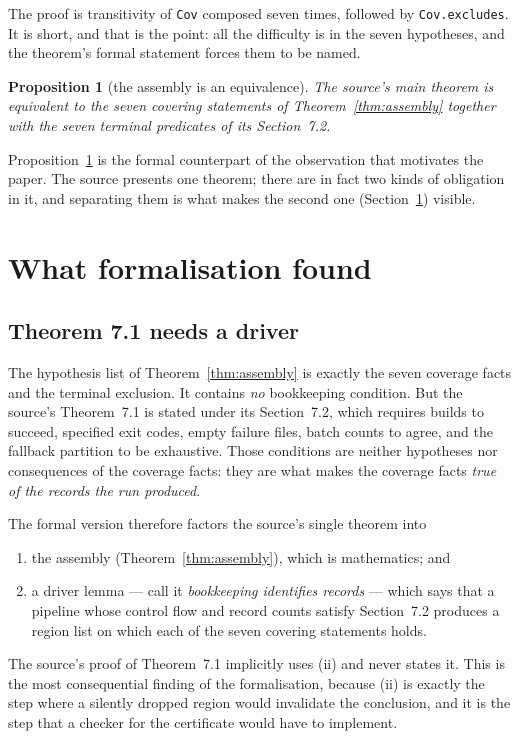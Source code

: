 \documentclass[11pt]{article}
\newtheorem{proposition}[theorem]{Proposition}
\theoremstyle{definition}
\begin{document}
The proof is transitivity of \texttt{Cov} composed seven times, followed by
\texttt{Cov.excludes}. It is short, and that is the point: all the difficulty is in the seven
hypotheses, and the theorem's formal statement forces them to be named.

\begin{proposition}[the assembly is an equivalence]\label{prop:iff}
The source's main theorem is equivalent to the seven covering statements of
Theorem~\ref{thm:assembly} together with the seven terminal predicates of its Section~7.2.
\end{proposition}

Proposition~\ref{prop:iff} is the formal counterpart of the observation that motivates the paper.
The source presents one theorem; there are in fact two kinds of obligation in it, and separating
them is what makes the second one (Section~\ref{sec:findings}) visible.

\section{What formalisation found}
\label{sec:findings}

\subsection{Theorem 7.1 needs a driver}

The hypothesis list of Theorem~\ref{thm:assembly} is exactly the seven coverage facts and the
terminal exclusion. It contains \emph{no} bookkeeping condition. But the source's Theorem~7.1 is
stated under its Section~7.2, which requires builds to succeed, specified exit codes, empty failure
files, batch counts to agree, and the fallback partition to be exhaustive. Those conditions are
neither hypotheses nor consequences of the coverage facts: they are what makes the coverage facts
\emph{true of the records the run produced}.

The formal version therefore factors the source's single theorem into
\begin{enumerate}[label=(\roman*)]
\item the assembly (Theorem~\ref{thm:assembly}), which is mathematics; and
\item a driver lemma --- call it \emph{bookkeeping identifies records} --- which says that a
      pipeline whose control flow and record counts satisfy Section~7.2 produces a region list on
      which each of the seven covering statements holds.
\end{enumerate}
The source's proof of Theorem~7.1 implicitly uses (ii) and never states it. This is the most
consequential finding of the formalisation, because (ii) is exactly the step where a silently
dropped region would invalidate the conclusion, and it is the step that a checker for the
certificate would have to implement.
\end{document}
